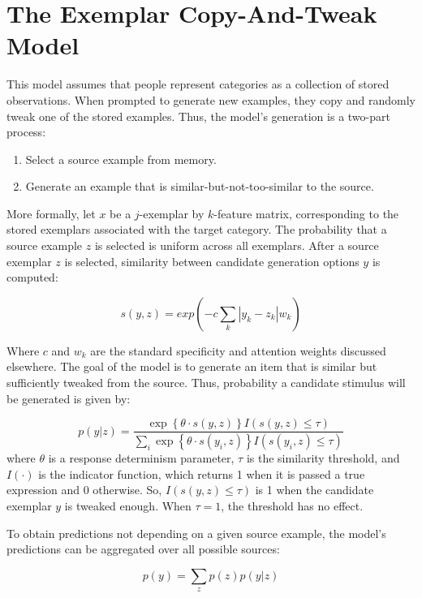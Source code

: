 \documentclass[12pt]{article}
\begin{document}
\section{The Exemplar Copy-And-Tweak Model}

This model assumes that people represent categories as a collection of stored observations. When prompted to generate new examples, they copy and randomly tweak one of the stored examples. Thus, the model's generation is a two-part process:

\begin{enumerate}
  \item Select a source example from memory.
  \item Generate an example that is similar-but-not-too-similar to the source.
\end{enumerate}

More formally, let $x$ be a $j$-exemplar by $k$-feature matrix, corresponding to the stored exemplars associated with the target category. The probability that a source example $z$ is selected is uniform across all exemplars. After a source exemplar $z$ is selected, similarity between candidate generation options $y$ is computed:

\begin{equation}
  s(y,z) = exp( -c \sum_k{|y_k - z_k|w_k})
\end{equation}

Where $c$ and $w_k$ are the standard specificity and attention weights discussed elsewhere. The goal of the model is to generate an item that is similar but sufficiently tweaked from the source. Thus, probability a candidate stimulus will be generated is given by:

\begin{equation}
    p(y|z)  = \dfrac
    { \exp \left\{\theta \cdot s(y,z) \right\} I\left(s(y,z) \leq \tau\right) }
    {\sum_i{\exp \left\{ \theta \cdot s(y_i,z) \right\} I\left(s(y_i,z) \leq \tau\right)}} 
    \label{eq:generation-choice}
\end{equation}
% 
where $\theta$ is a response determinism parameter, $\tau$ is the similarity threshold, and $I(\cdot)$ is the indicator function, which returns 1 when it is passed a true expression and 0 otherwise. So, $I\left(s(y,z) \leq \tau\right)$ is 1 when the candidate exemplar $y$ is tweaked enough. When $\tau=1$, the threshold has no effect.

To obtain predictions not depending on a given source example, the model's predictions can be aggregated over all possible sources:

\begin{equation}
  p(y) = \sum_z{p(z)p(y|z) }
\end{equation}
\end{document}
